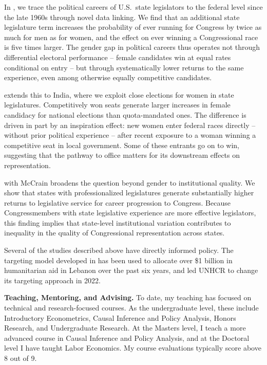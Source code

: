\documentclass[10pt, letter]{article}
\begin{document}
In , we trace the political careers of U.S.\ state legislators to the federal level since the late 1960s through novel data linking. We find that an additional state legislature term increases the probability of ever running for Congress by twice as much for men as for women, and the effect on ever winning a Congressional race is five times larger. The gender gap in political careers thus operates not through differential electoral performance -- female candidates win at equal rates conditional on entry -- but through systematically lower returns to the same experience, even among otherwise equally competitive candidates.

 extends this to India, where we exploit close elections for women in state legislatures. Competitively won seats generate larger increases in female candidacy for national elections than quota-mandated ones. The difference is driven in part by an inspiration effect: new women enter federal races directly -- without prior political experience -- after recent exposure to a woman winning a competitive seat in local government. Some of these entrants go on to win, suggesting that the pathway to office matters for its downstream effects on representation.

 with McCrain broadens the question beyond gender to institutional quality. We show that states with professionalized legislatures generate substantially higher returns to legislative service for career progression to Congress. Because Congressmembers with state legislative experience are more effective legislators, this finding implies that state-level institutional variation contributes to inequality in the quality of Congressional representation across states.

Several of the studies described above have directly informed policy. The targeting model developed in  has been used to allocate over \$1 billion in humanitarian aid in Lebanon over the past six years, and  led UNHCR to change its targeting approach in 2022.


\noindent \textbf{Teaching, Mentoring, and Advising.}
To date, my teaching has focused on technical and research-focused courses. As the undergraduate level, these include Introductory Econometrics, Causal Inference and Policy Analysis, Honors Research, and Undergraduate Research. At the Masters level, I teach a more advanced course in Causal Inference and Policy Analysis, and at the Doctoral level I have taught Labor Economics. My course evaluations typically score above 8 out of 9. 
\end{document}
